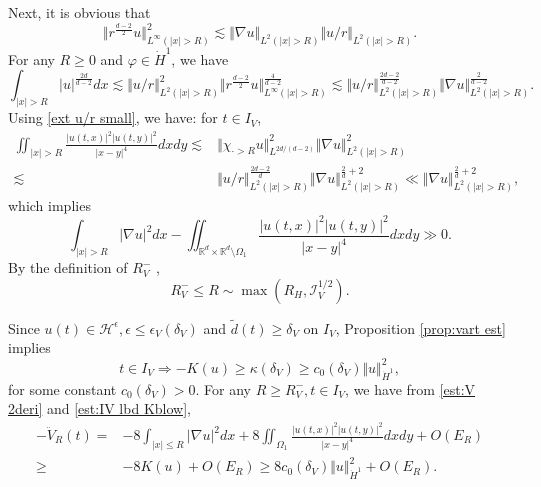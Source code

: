 \documentclass[reqno, 11pt]{amsart}
\numberwithin{equation}{section}
\newcommand{\R}{\mathbb{R}}
\theoremstyle{plain}
\theoremstyle{definition}
\numberwithin{equation}{section}
\numberwithin{theorem}{section}
\numberwithin{equation}{section}
\numberwithin{equation}{section}
\numberwithin{theorem}{section}
\begin{document}
	Next, it is obvious that
	\begin{equation*}
	\Vert r^{\frac{d-2}{2}}u \Vert_{L^\infty(|x|>R)}^2 \lesssim \Vert \nabla u \Vert_{L^2(|x|>R)} \Vert u/r \Vert_{L^2(|x|>R)}.
	\end{equation*}
	For any $R\geq0$ and $\varphi \in \dot H^1$, we have
	\begin{equation*}
	\int_{|x|>R} |u|^{\frac{2d}{d-2}} dx \lesssim  \Vert u/r \Vert_{L^2(|x|>R)}^2 \Vert r^{\frac{d-2}{2}}u \Vert_{L^\infty(|x|>R)}^{\frac{4}{d-2}}\lesssim \Vert u/r \Vert_{L^2(|x|>R)}^{\frac{2d-2}{d-2}} \Vert \nabla u \Vert_{L^2(|x|>R)}^{\frac{2}{d-2}}.
	\end{equation*}
	Using \eqref{ext u/r small}, we have: for $t\in I_V$,
	\begin{equation*}
	\begin{aligned}
	\iint_{|x|>R} \frac{|u(t,x)|^2|u(t,y)|^2}{|x-y|^4} dxdy\lesssim& \Vert \chi_{\cdot>R} u\Vert_{L^{2d/(d-2)}}^2 \Vert\nabla u \Vert_{L^2(|x|>R)}^2\\  \lesssim& \Vert u/r \Vert_{L^2(|x|>R)}^{\frac{2d-2}{d}} \Vert \nabla u \Vert_{L^2(|x|>R)}^{\frac{2}{d}+2}\ll \Vert \nabla u \Vert_{L^2(|x|>R)}^{\frac{2}{d}+2},
	\end{aligned}
	\end{equation*}
	which implies
	\begin{equation}\label{est:conv remn}
	\int_{|x|>R} |\nabla u|^2 dx-\iint_{\R^d\times \R^d \setminus \varOmega_1} \frac{|u(t,x)|^2|u(t,y)|^2}{|x-y|^4} dxdy \gg 0.
	\end{equation}
	By the definition of $R_{V}^{-}$ ,
	\begin{equation}\label{est:RV- bd}
	R_{V}^{-}\leq R\sim \max(R_H,\mathcal{I}_V^{1/2}).
	\end{equation}
	
	Since $u(t)\in \mathcal{H}^{\epsilon}, \epsilon \leq \epsilon_{V}(\delta_{V})$ and $\widetilde{d}(t) \geq \delta_{V}$ on $I_V$, Proposition \ref{prop:vart est} implies 
	\begin{equation}\label{est:IV lbd Kblow}
	t\in I_V \Longrightarrow -K(u)\geq \kappa(\delta_{V}) \geq c_0(\delta_{V})\Vert u \Vert_{\dot H^1}^2 ,
	\end{equation}
	for some constant $c_0(\delta_{V})>0$.
	For any $R\geq R_{V}^{-}, t\in I_V $, we have from \eqref{est:V 2deri} and \eqref{est:IV lbd Kblow},
	\begin{equation*}
	\begin{aligned}
	-\ddot{V}_R(t)=&-8\int_{|x|\leq R} |\nabla u|^{2}dx+8\iint_{\varOmega_1} \frac{\big|u(t,x)\big|^2\big|u(t,y)\big|^2}{|x-y|^4} dxdy+O(E_R)\\\geq&-8K(u)+O(E_R) \geq8 c_0(\delta_{V})\Vert u \Vert_{\dot H^1}^2+O(E_R).
	\end{aligned}
	\end{equation*}
	
\end{document}
